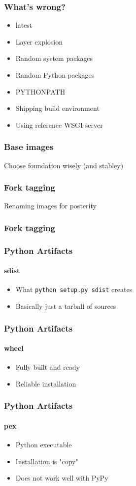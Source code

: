 \documentclass{beamer}
\begin{document}
\begin{frame}[fragile]
\frametitle{What's wrong?}
\begin{itemize}
\item latest \pause
\item Layer explosion \pause
\item Random system packages \pause
\item Random Python packages \pause
\item PYTHONPATH \pause
\item Shipping build environment \pause
\item Using reference WSGI server
\end{itemize}
\end{frame}

\begin{frame}
\frametitle{Base images}
Choose foundation wisely (and stabley)
\end{frame}

\begin{frame}
\frametitle{Fork tagging}
Renaming images for posterity
\end{frame}

\begin{frame}[fragile]
\frametitle{Fork tagging}

\end{frame}

\begin{frame}[fragile]
\frametitle{Python Artifacts}
\framesubtitle{sdist}
\begin{itemize}
\item What \verb|python setup.py sdist| creates
\item Basically just a tarball of sources
\end{itemize}
\end{frame}

\begin{frame}[fragile]
\frametitle{Python Artifacts}
\framesubtitle{wheel}
\begin{itemize}
\item Fully built and ready
\item Reliable installation
\end{itemize}
\end{frame}

\begin{frame}[fragile]
\frametitle{Python Artifacts}
\framesubtitle{pex}
\begin{itemize}
\item Python executable
\item Installation is "copy"
\item Does not work well with PyPy
\end{itemize}
\end{frame}
\end{document}
